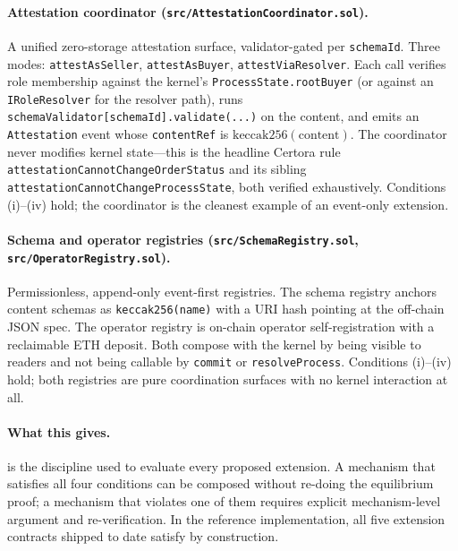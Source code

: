 \documentclass[11pt,a4paper]{article}
\theoremstyle{definition}
\theoremstyle{remark}
\begin{document}
\paragraph{Attestation coordinator (\texttt{src/AttestationCoordinator.sol}).}
A unified zero-storage attestation surface, validator-gated per
\texttt{schemaId}. Three modes: \texttt{attestAsSeller},
\texttt{attestAsBuyer}, \texttt{attestViaResolver}. Each call
verifies role membership against the kernel's
\texttt{ProcessState.rootBuyer} (or against an
\texttt{IRoleResolver} for the resolver path), runs
\texttt{schemaValidator[schemaId].validate(...)} on the content, and
emits an \texttt{Attestation} event whose \texttt{contentRef} is
$\mathrm{keccak256}(\text{content})$. The coordinator never modifies
kernel state---this is the headline Certora rule
\texttt{attestationCannotChangeOrderStatus} and its sibling
\texttt{attestationCannotChangeProcessState}, both verified
exhaustively. Conditions (i)--(iv) hold; the coordinator is the
cleanest example of an event-only extension.

\paragraph{Schema and operator registries (\texttt{src/SchemaRegistry.sol}, \texttt{src/OperatorRegistry.sol}).}
Permissionless, append-only event-first registries. The schema
registry anchors content schemas as \texttt{keccak256(name)} with a
URI hash pointing at the off-chain JSON spec. The operator registry
is on-chain operator self-registration with a reclaimable ETH
deposit. Both compose with the kernel by being visible to readers
and not being callable by \texttt{commit} or
\texttt{resolveProcess}. Conditions (i)--(iv) hold; both registries
are pure coordination surfaces with no kernel interaction at all.

\paragraph{What this gives.}
 is the discipline used to evaluate every
proposed extension. A mechanism that satisfies all four conditions
can be composed without re-doing the equilibrium proof; a mechanism
that violates one of them requires explicit mechanism-level argument
and re-verification. In the reference implementation, all five
extension contracts shipped to date satisfy
 by construction.
\end{document}
